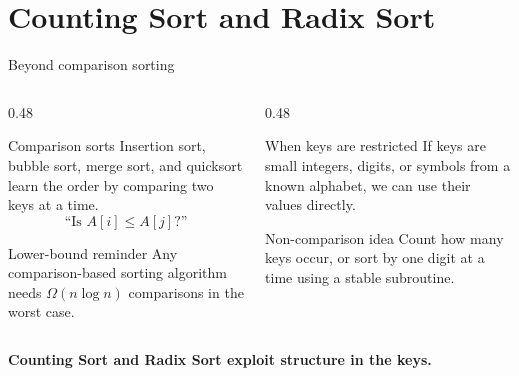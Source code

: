\documentclass[aspectratio=169]{beamer}
\begin{document}
\section{Counting Sort and Radix Sort}

\begin{frame}{Beyond comparison sorting}
\small
\begin{columns}[T,onlytextwidth]
  \begin{column}{0.48\textwidth}
    \begin{block}{Comparison sorts}
      Insertion sort, bubble sort, merge sort, and quicksort learn the order by
      comparing two keys at a time.
      \[
        \text{``Is } A[i] \le A[j]\text{?''}
      \]
    \end{block}
    \begin{alertblock}{Lower-bound reminder}
      Any comparison-based sorting algorithm needs $\Omega(n\log n)$
      comparisons in the worst case.
    \end{alertblock}
  \end{column}
  \begin{column}{0.48\textwidth}
    \begin{exampleblock}{When keys are restricted}
      If keys are small integers, digits, or symbols from a known alphabet, we
      can use their values directly.
    \end{exampleblock}
    \begin{block}{Non-comparison idea}
      Count how many keys occur, or sort by one digit at a time using a stable
      subroutine.
    \end{block}
  \end{column}
\end{columns}
\vspace{0.3em}
\centering
\Large\color{ForestGreen}\textbf{Counting Sort and Radix Sort exploit structure in the keys.}
\end{frame}
\end{document}
